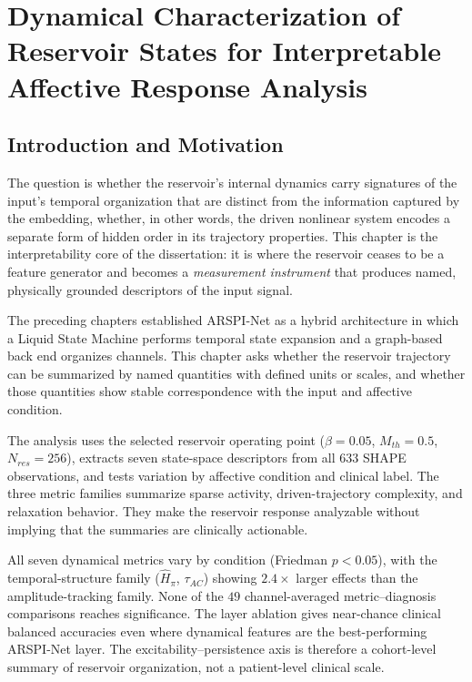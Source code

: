 \chapter{Dynamical Characterization of Reservoir States for Interpretable Affective Response Analysis}
\label{chap:dynamics}

\section{Introduction and Motivation}

The question is whether the reservoir's internal dynamics carry signatures of the input's temporal organization that are distinct from the information captured by the embedding, whether, in other words, the driven nonlinear system encodes a separate form of hidden order in its trajectory properties. This chapter is the interpretability core of the dissertation: it is where the reservoir ceases to be a feature generator and becomes a \emph{measurement instrument} that produces named, physically grounded descriptors of the input signal.

The preceding chapters established ARSPI-Net as a hybrid architecture in which a Liquid State Machine performs temporal state expansion and a graph-based back end organizes channels. This chapter asks whether the reservoir trajectory can be summarized by named quantities with defined units or scales, and whether those quantities show stable correspondence with the input and affective condition.

The analysis uses the selected reservoir operating point ($\beta = 0.05$, $M_{th}=0.5$, $N_{res}=256$), extracts seven state-space descriptors from all $633$ SHAPE observations, and tests variation by affective condition and clinical label. The three metric families summarize sparse activity, driven-trajectory complexity, and relaxation behavior. They make the reservoir response analyzable without implying that the summaries are clinically actionable.

All seven dynamical metrics vary by condition (Friedman $p < 0.05$), with the temporal-structure family ($\hat{H}_{\pi}$, $\tau_{AC}$) showing $2.4\times$ larger effects than the amplitude-tracking family. None of the $49$ channel-averaged metric--diagnosis comparisons reaches significance. The layer ablation gives near-chance clinical balanced accuracies even where dynamical features are the best-performing ARSPI-Net layer. The excitability--persistence axis is therefore a cohort-level summary of reservoir organization, not a patient-level clinical scale.

